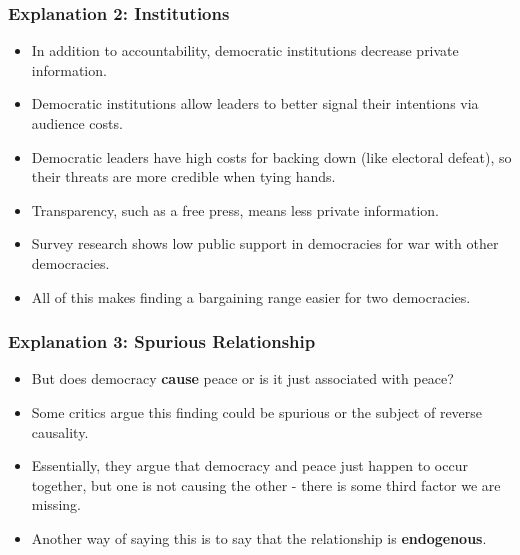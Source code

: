 \documentclass{beamer}
\begin{document}
\begin{frame} 
\frametitle{\LARGE{Explanation 2: Institutions}}
\begin{itemize}
	\item In addition to accountability, democratic institutions decrease private information.
	\item Democratic institutions allow leaders to better signal their intentions via audience costs. \pause 
	\item Democratic leaders have high costs for backing down (like electoral defeat), so their threats are more credible when tying hands. \pause 
	\item Transparency, such as a free press, means less private information. \pause
	\item Survey research shows low public support in democracies for war with other democracies.
	\item All of this makes finding a bargaining range easier for two democracies.
\end{itemize}
\end{frame}

\begin{frame} 
\frametitle{\LARGE{Explanation 3: Spurious Relationship}}
\begin{itemize}
		\item But does democracy \textbf{cause} peace or is it just associated with peace? \pause
		\item Some critics argue this finding could be spurious or the subject of reverse causality. \pause 
		\item Essentially, they argue that democracy and peace just happen to occur together, but one is not causing the other - there is some third factor we are missing.
		\item Another way of saying this is to say that the relationship is \textbf{endogenous}.
\end{itemize}
\end{frame}
\end{document}
